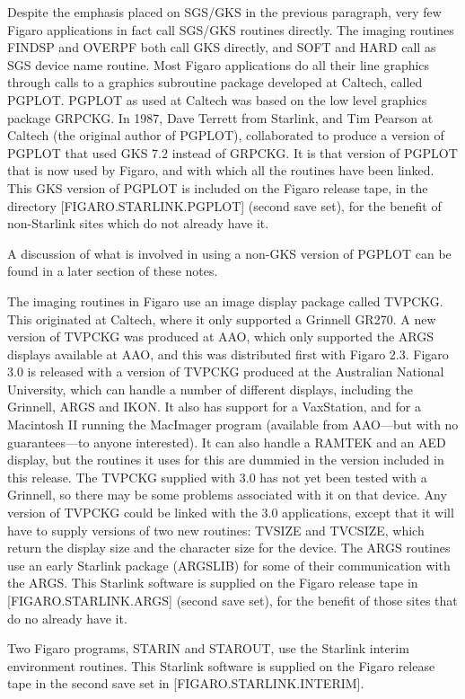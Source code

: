 Despite the emphasis placed on SGS/GKS in the previous paragraph, very few
Figaro applications in fact call SGS/GKS routines directly. The imaging
routines FINDSP and OVERPF both call GKS directly, and SOFT and HARD  call as
SGS device name routine. Most Figaro applications do all their line graphics
through calls to a graphics subroutine package developed at  Caltech, called
PGPLOT. PGPLOT as used at Caltech was based on the low level  graphics package
GRPCKG. In 1987, Dave Terrett from Starlink, and Tim Pearson at Caltech (the
original author of PGPLOT), collaborated to produce  a version of PGPLOT that
used GKS 7.2 instead of GRPCKG. It is that version of PGPLOT that is now used
by Figaro, and with which all the  routines have been linked. This GKS version
of PGPLOT is included on the Figaro release tape, in the directory
[FIGARO.STARLINK.PGPLOT] (second save  set), for the benefit of non-Starlink
sites which do not already have it.

A discussion of what is involved in using a non-GKS version of PGPLOT can be
found in a later section of these notes.

The imaging routines in Figaro use an image display package called  TVPCKG.
This originated at Caltech, where it only supported a Grinnell GR270.  A new
version of TVPCKG was produced at AAO, which only supported the  ARGS displays
available at AAO, and this was distributed first with Figaro 2.3. Figaro 3.0 is
released with a version of TVPCKG produced at the Australian National
University, which can handle a number of different  displays, including the
Grinnell, ARGS and IKON. It also has support for a VaxStation, and for a
Macintosh II running the MacImager program (available from AAO---but with no
guarantees---to anyone interested). It can also handle a RAMTEK and an AED
display, but the routines it uses for this are dummied in the version included
in this release. The TVPCKG supplied with 3.0 has not yet been tested with a
Grinnell, so there may be some problems  associated with it on that device. Any
version of TVPCKG could be linked with the 3.0 applications, except that it
will have to supply versions of two new routines: TVSIZE and TVCSIZE, which
return the display size and the character size for the device. The ARGS
routines use an early  Starlink package (ARGSLIB) for some of their
communication with the ARGS. This Starlink software is supplied on the Figaro
release tape in [FIGARO.STARLINK.ARGS] (second save set), for the benefit of
those sites that do no already have it.

Two Figaro programs, STARIN and STAROUT, use the Starlink interim environment
routines. This Starlink software is supplied on the Figaro release  tape in the
second save set  in [FIGARO.STARLINK.INTERIM].

